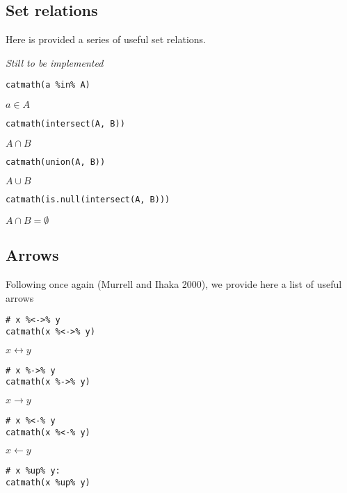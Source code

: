 \hypertarget{set-relations}{%
\subsection{Set relations}\label{set-relations}}

Here is provided a series of useful set relations.

\emph{Still to be implemented}

\begin{verbatim}
catmath(a %in% A)
\end{verbatim}

\({{a}\in{A}}\)

\begin{verbatim}
catmath(intersect(A, B))
\end{verbatim}

\({{A}\cap{B}}\)

\begin{verbatim}
catmath(union(A, B))
\end{verbatim}

\({{A}\cup{B}}\)

\begin{verbatim}
catmath(is.null(intersect(A, B)))
\end{verbatim}

\({{{A}\cap{B}}=\emptyset}\)

\hypertarget{arrows}{%
\subsection{Arrows}\label{arrows}}

Following once again (Murrell and Ihaka 2000), we provide here a list of useful arrows

\begin{verbatim}
# x %<->% y
catmath(x %<->% y)
\end{verbatim}

\({{x}\leftrightarrow{y}}\)

\begin{verbatim}
# x %->% y
catmath(x %->% y)
\end{verbatim}

\({{x}\rightarrow{y}}\)

\begin{verbatim}
# x %<-% y
catmath(x %<-% y)
\end{verbatim}

\({{x}\leftarrow{y}}\)

\begin{verbatim}
# x %up% y:
catmath(x %up% y)
\end{verbatim}

